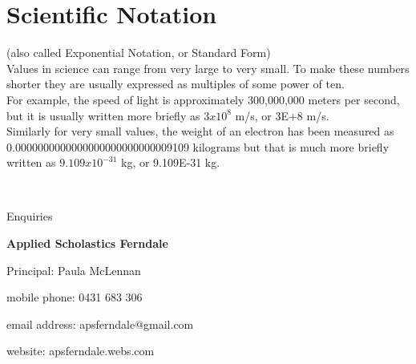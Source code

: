 \documentclass{article}
\begin{document}
\newpage

\section{Scientific Notation}
(also called Exponential Notation, or Standard Form)\\

Values in science can range from very large to very small. To make these numbers shorter they are usually expressed as multiples of some power of ten.\\

For example, the speed of light is approximately 300,000,000 meters per second, but it is usually written more briefly as $3x10^8$ m/s, or 3E+8 m/s.\\

Similarly for very small values, the weight of an electron has been measured as\\0.0000000000000000000000000009109 kilograms but that is much more briefly written as $9.109x10^{-31}$ kg, or 9.109E-31 kg.

\newpage
\
\newpage
\
\newpage
\
\newpage
\
\newpage
\
\newpage
\
\newpage
\
\newpage
\
\newpage
\
\newpage
\

\begin{center}
\linespread{2}\large

Enquiries

\textbf{Applied Scholastics Ferndale}

Principal: Paula McLennan

mobile phone: 0431 683 306

email address: apsferndale@gmail.com

website: apsferndale.webs.com
\end{center}
\end{document}
